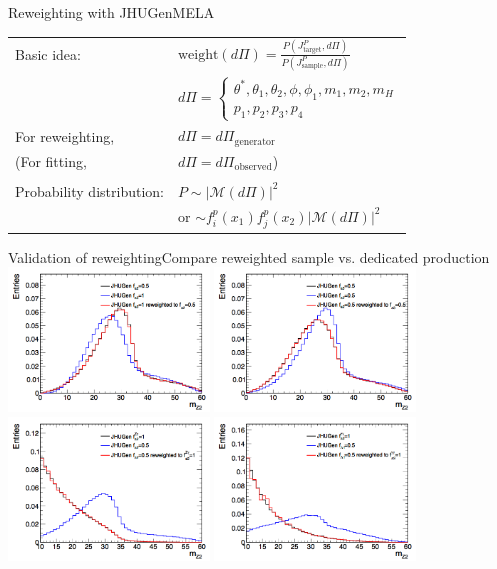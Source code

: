 \documentclass[usenames,dvipsnames,svgnames,table]{beamer}
\begin{document}
\begin{frame}{Reweighting with JHUGenMELA}
\begin{tabular}{ll}
Basic idea: & $\text{weight}\left(d\Pi\right)=\frac{P(J^P_\text{target},d\Pi)}{P(J^P_\text{sample},d\Pi)}$ \\
& $d\Pi = \begin{cases} \theta^*, \theta_1, \theta_2, \phi, \phi_1, m_1, m_2, m_H \\ p_1, p_2, p_3, p_4 \end{cases}$ \\
For reweighting, & $d\Pi = d\Pi_\text{generator}$ \\
(For fitting, & $d\Pi = d\Pi_\text{observed}$) \\
& \\
Probability distribution: & $P\sim\left|\mathcal{M}(d\Pi)\right|^2$ \\
 & or $\sim f^p_i(x_1)f^p_j(x_2)\left|\mathcal{M}(d\Pi)\right|^2$

\end{tabular}
\end{frame}

\begin{frame}{Validation of reweighting}{Compare reweighted sample vs. dedicated production}
\centering
\includegraphics[width=0.4\textwidth]{reweighting/validation/fa2halffa31} %
\includegraphics[width=0.4\textwidth]{reweighting/validation/fa2halffa3half}\\
\includegraphics[width=0.4\textwidth]{reweighting/validation/fa2Zgamma} %
\includegraphics[width=0.4\textwidth]{reweighting/validation/flambda1fa3Zgamma}
\end{frame}
\end{document}
